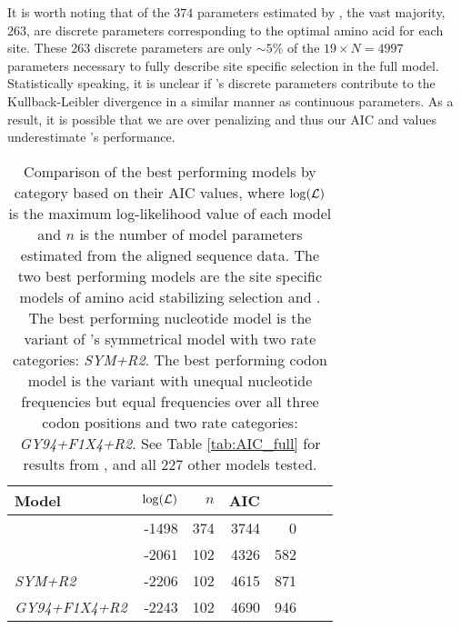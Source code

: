 It is worth noting that of the $374$ parameters estimated by \selac, the vast majority, $263$, are discrete parameters corresponding to the optimal amino acid for each site.
These 263 discrete parameters are only $\sim5\%$ of the $19\times N = 4997$ parameters necessary to fully describe site specific selection in the full \hb model.
Statistically speaking, it is unclear if \selac's discrete parameters contribute to the Kullback-Leibler divergence in a similar manner as continuous parameters.
As a result, it is possible that we are over penalizing \selac and thus our AIC and \DeltaAIC values underestimate \selac's performance.

\begin{table}
  \centering
  \caption{Comparison of the best performing models by category based on their AIC values, where  $\log(\mathcal{L})$ is the maximum log-likelihood value of each model and $n$ is the number of model parameters estimated from the aligned sequence data.
    The two best performing models are the site specific models of amino acid stabilizing selection \selac and \phydms.
    The best performing nucleotide model is the variant of \citet{zharkikh1994}'s symmetrical model with two rate categories: \emph{SYM+R2}. 
    The best performing codon model is the \gy variant with unequal nucleotide frequencies but equal frequencies over all three codon positions and two rate categories: \emph{GY94+F1X4+R2}.    
  See Table \ref{tab:AIC_full} for results from \selac, \phydms and all 227 other models tested.
}  
  \begin{tabular}{lrrrrrr}
    \hline
    Model							& $\log(\mathcal{L})$ & $n$ & AIC & \DeltaAIC \\ \hline 
    \selac							& -1498 & 374 & 3744 &  0 \\
    \phydms 						& -2061 & 102 & 4326 & 582 \\
    \emph{SYM+R2} 				& -2206 & 102 & 4615 & 871 \\
    \emph{GY94+F1X4+R2} 		& -2243 & 102 & 4690 & 946 \\ \hline
  \end{tabular}
  \label{tab:AIC_selac}
\end{table}


